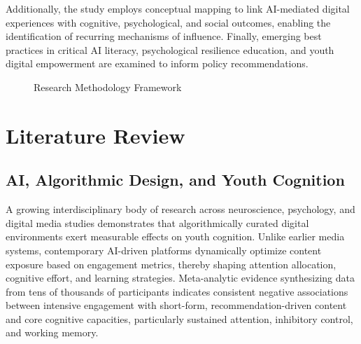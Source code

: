 \documentclass[12pt,a4paper]{report}
\begin{document}
Additionally, the study employs conceptual mapping to link AI-mediated digital experiences with cognitive, psychological, and social outcomes, enabling the identification of recurring mechanisms of influence. Finally, emerging best practices in critical AI literacy, psychological resilience education, and youth digital empowerment are examined to inform policy recommendations.

\begin{figure}[H]
  \centering
  \caption{Research Methodology Framework}
  \label{fig:methodology}
\end{figure}



\chapter{Literature Review}

\section{AI, Algorithmic Design, and Youth Cognition}

A growing interdisciplinary body of research across neuroscience, psychology, and digital media studies demonstrates that algorithmically curated digital environments exert measurable effects on youth cognition. Unlike earlier media systems, contemporary AI-driven platforms dynamically optimize content exposure based on engagement metrics, thereby shaping attention allocation, cognitive effort, and learning strategies. Meta-analytic evidence synthesizing data from tens of thousands of participants indicates consistent negative associations between intensive engagement with short-form, recommendation-driven content and core cognitive capacities, particularly sustained attention, inhibitory control, and working memory.
\end{document}
